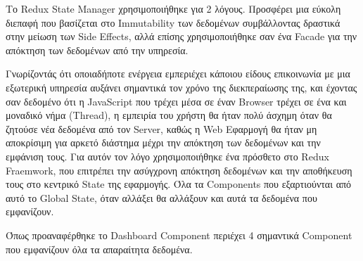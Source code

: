 Το Redux State Manager χρησιμοποιήθηκε για 2 λόγους. Προσφέρει μια εύκολη διεπαφή που βασίζεται στο Immutability των δεδομένων συμβάλλοντας δραστικά στην μείωση των Side Effects, αλλά επίσης χρησιμοποιήθηκε σαν ένα Facade για την απόκτηση των δεδομένων από την υπηρεσία.

Γνωρίζοντάς ότι οποιαδήποτε ενέργεια εμπεριέχει κάποιου είδους επικοινωνία με μια εξωτερική υπηρεσία αυξάνει σημαντικά τον χρόνο της διεκπεραίωσης της, και έχοντας σαν δεδομένο ότι η JavaScript που τρέχει μέσα σε έναν Browser τρέχει σε ένα και μοναδικό νήμα (Thread), η εμπειρία του χρήστη θα ήταν πολύ άσχημη όταν θα ζητούσε νέα δεδομένα από τον Server, καθώς η Web Εφαρμογή θα ήταν μη αποκρίσιμη για αρκετό διάστημα μέχρι την απόκτηση των δεδομένων και την εμφάνιση τους. Για αυτόν τον λόγο χρησιμοποιήθηκε ένα πρόσθετο στο Redux Fraemwork, που επιτρέπει την ασύγχρονη απόκτηση δεδομένων και την αποθήκευση τους στο κεντρικό State της εφαρμογής. Όλα τα Components που εξαρτιούνται από αυτό το Global State, όταν αλλάξει θα αλλάξουν και αυτά τα δεδομένα που εμφανίζουν.

Όπως προαναφέρθηκε το Dashboard Component περιέχει 4 σημαντικά Component που εμφανίζουν όλα τα απαραίτητα δεδομένα.




